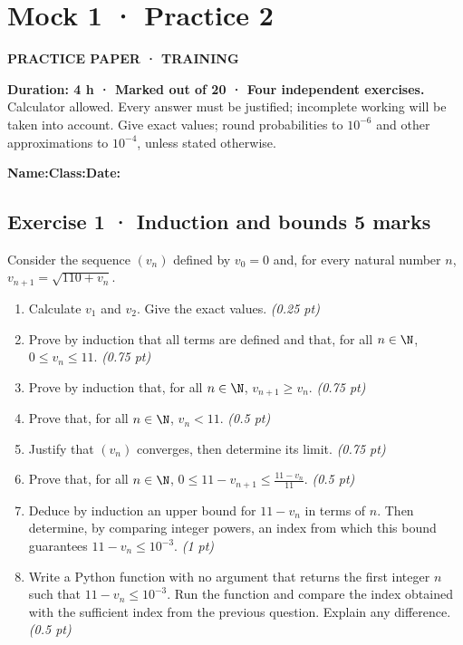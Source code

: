 \fi

\clearpage{}\label{sujet:5-2}

\section*{Mock 1 · Practice 2}

{\sffamily\bfseries\color{teal}PRACTICE PAPER · TRAINING\par}

\textbf{Duration: 4 h · Marked out of 20 · Four independent exercises.}\\Calculator allowed. Every answer must be justified; incomplete working will be taken into account. Give exact values; round probabilities to $10^{-6}$ and other approximations to $10^{-4}$, unless stated otherwise.

\smallskip\textbf{Name:}\enspace\dotfill\quad\textbf{Class:}\enspace\dotfill\quad\textbf{Date:}\enspace\dotfill

\subsection*{Exercise 1 · Induction and bounds \hfill 5 marks}Consider the sequence $(v_n)$ defined by $v_0=0$ and, for every natural number $n$, $v_{n+1}=\sqrt{110+v_n}$.

\begin{enumerate}

\item Calculate $v_1$ and $v_2$. Give the exact values. \hfill\textit{(0.25 pt)}

\item Prove by induction that all terms are defined and that, for all $n\in\N$, $0\le v_n\le11$. \hfill\textit{(0.75 pt)}

\item Prove by induction that, for all $n\in\N$, $v_{n+1}\ge v_n$. \hfill\textit{(0.75 pt)}

\item Prove that, for all $n\in\N$, $v_n<11$. \hfill\textit{(0.5 pt)}

\item Justify that $(v_n)$ converges, then determine its limit. \hfill\textit{(0.75 pt)}

\item Prove that, for all $n\in\N$, $0\le 11-v_{n+1}\le\frac{11-v_n}{11}$. \hfill\textit{(0.5 pt)}

\item Deduce by induction an upper bound for $11-v_n$ in terms of $n$. Then determine, by comparing integer powers, an index from which this bound guarantees $11-v_n\le10^{-3}$. \hfill\textit{(1 pt)}

\item Write a Python function with no argument that returns the first integer $n$ such that $11-v_n\le10^{-3}$. Run the function and compare the index obtained with the sufficient index from the previous question. Explain any difference. \hfill\textit{(0.5 pt)}

\end{enumerate}

